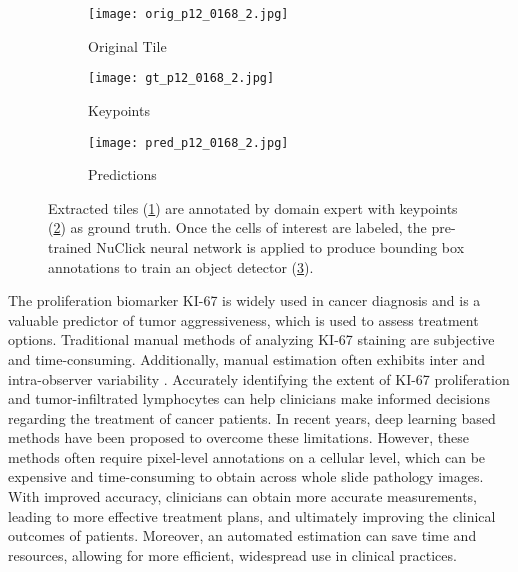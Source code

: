 \documentclass[runningheads]{llncs}
\begin{document}
\begin{figure}
    \centering
    \begin{subfigure}[b]{0.3\textwidth}
        \centering
        \texttt{[image: orig\_p12\_0168\_2.jpg]}
        \caption{Original Tile}
        \label{fig:p12orig}
    \end{subfigure}
    \hfill
    \begin{subfigure}[b]{0.3\textwidth}
        \centering
        \texttt{[image: gt\_p12\_0168\_2.jpg]}
        \caption{Keypoints}
        \label{fig:p12kp}
    \end{subfigure}
    \hfill
    \begin{subfigure}[b]{0.3\textwidth}
        \centering
        \texttt{[image: pred\_p12\_0168\_2.jpg]}
        \caption{Predictions}
        \label{fig:p12bbox}
    \end{subfigure}
    \caption{Extracted tiles (\ref{fig:p12orig}) are annotated by domain expert with keypoints (\ref{fig:p12kp}) as ground truth. Once the cells of interest are labeled, the pre-trained NuClick neural network is applied to produce bounding box annotations to train an object detector (\ref{fig:p12bbox}).}
    \label{fig:p12_0168_2_gtvpred}
\end{figure}



The proliferation biomarker KI-67 \cite{scholzen2000ki,uxa2021ki,sun2018ki} is widely used in cancer diagnosis and is a valuable predictor of tumor aggressiveness, which is used to assess treatment options. Traditional manual methods of analyzing KI-67 staining are subjective and time-consuming. Additionally, manual estimation often exhibits inter and intra-observer variability \cite{karimi2020deep}. Accurately identifying the extent of KI-67 proliferation and tumor-infiltrated lymphocytes can help clinicians make informed decisions regarding the treatment of cancer patients. In recent years, deep learning \cite{lecun2015deep} based methods have been proposed to overcome these limitations. However, these methods often require pixel-level annotations on a cellular level, which can be expensive and time-consuming to obtain across whole slide pathology images. With improved accuracy, clinicians can obtain more accurate measurements, leading to more effective treatment plans, and ultimately improving the clinical outcomes of patients. Moreover, an automated estimation can save time and resources, allowing for more efficient, widespread use in clinical practices.
\end{document}
